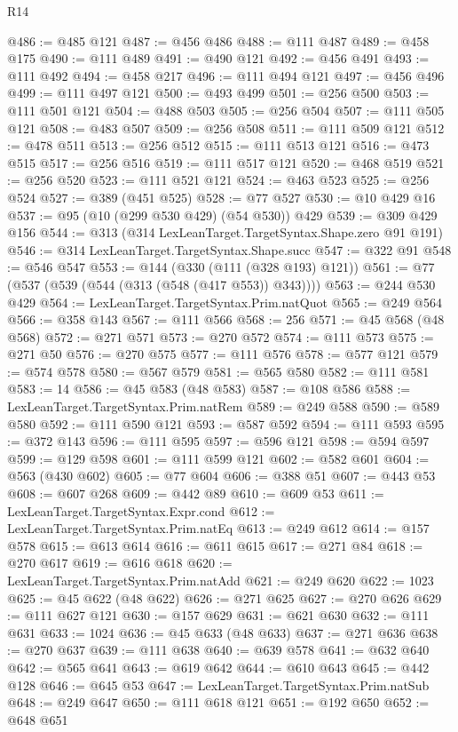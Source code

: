 \begin{lexlean}{R14}
\begin{coremodule}
@486 := @485 @121
@487 := @456 @486
@488 := @111 @487
@489 := @458 @175
@490 := @111 @489
@491 := @490 @121
@492 := @456 @491
@493 := @111 @492
@494 := @458 @217
@496 := @111 @494 @121
@497 := @456 @496
@499 := @111 @497 @121
@500 := @493 @499
@501 := @256 @500
@503 := @111 @501 @121
@504 := @488 @503
@505 := @256 @504
@507 := @111 @505 @121
@508 := @483 @507
@509 := @256 @508
@511 := @111 @509 @121
@512 := @478 @511
@513 := @256 @512
@515 := @111 @513 @121
@516 := @473 @515
@517 := @256 @516
@519 := @111 @517 @121
@520 := @468 @519
@521 := @256 @520
@523 := @111 @521 @121
@524 := @463 @523
@525 := @256 @524
@527 := @389 (@451 @525)
@528 := @77 @527
@530 := @10 @429 @16
@537 := @95 (@10 (@299 @530 @429) (@54 @530)) @429
@539 := @309 @429 @156
@544 := @313 (@314 LexLeanTarget.TargetSyntax.Shape.zero @91 @191)
@546 := @314 LexLeanTarget.TargetSyntax.Shape.succ
@547 := @322 @91
@548 := @546 @547
@553 := @144 (@330 (@111 (@328 @193) @121))
@561 := @77 (@537 (@539 (@544 (@313 (@548 (@417 @553)) @343))))
@563 := @244 @530 @429
@564 := LexLeanTarget.TargetSyntax.Prim.natQuot
@565 := @249 @564
@566 := @358 @143
@567 := @111 @566
@568 := 256
@571 := @45 @568 (@48 @568)
@572 := @271 @571
@573 := @270 @572
@574 := @111 @573
@575 := @271 @50
@576 := @270 @575
@577 := @111 @576
@578 := @577 @121
@579 := @574 @578
@580 := @567 @579
@581 := @565 @580
@582 := @111 @581
@583 := 14
@586 := @45 @583 (@48 @583)
@587 := @108 @586
@588 := LexLeanTarget.TargetSyntax.Prim.natRem
@589 := @249 @588
@590 := @589 @580
@592 := @111 @590 @121
@593 := @587 @592
@594 := @111 @593
@595 := @372 @143
@596 := @111 @595
@597 := @596 @121
@598 := @594 @597
@599 := @129 @598
@601 := @111 @599 @121
@602 := @582 @601
@604 := @563 (@430 @602)
@605 := @77 @604
@606 := @388 @51
@607 := @443 @53
@608 := @607 @268
@609 := @442 @89
@610 := @609 @53
@611 := LexLeanTarget.TargetSyntax.Expr.cond
@612 := LexLeanTarget.TargetSyntax.Prim.natEq
@613 := @249 @612
@614 := @157 @578
@615 := @613 @614
@616 := @611 @615
@617 := @271 @84
@618 := @270 @617
@619 := @616 @618
@620 := LexLeanTarget.TargetSyntax.Prim.natAdd
@621 := @249 @620
@622 := 1023
@625 := @45 @622 (@48 @622)
@626 := @271 @625
@627 := @270 @626
@629 := @111 @627 @121
@630 := @157 @629
@631 := @621 @630
@632 := @111 @631
@633 := 1024
@636 := @45 @633 (@48 @633)
@637 := @271 @636
@638 := @270 @637
@639 := @111 @638
@640 := @639 @578
@641 := @632 @640
@642 := @565 @641
@643 := @619 @642
@644 := @610 @643
@645 := @442 @128
@646 := @645 @53
@647 := LexLeanTarget.TargetSyntax.Prim.natSub
@648 := @249 @647
@650 := @111 @618 @121
@651 := @192 @650
@652 := @648 @651

\end{coremodule}
\end{lexlean}
